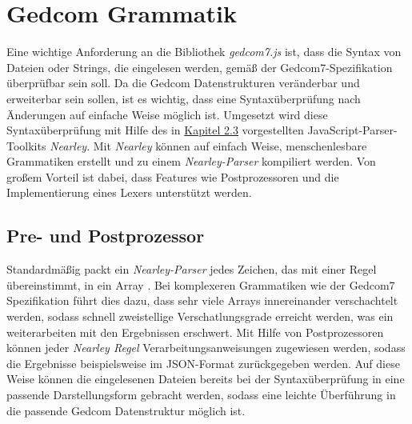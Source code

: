 \section{Gedcom Grammatik}
\label{sec: Konzept - Gedcom Grammatik}
Eine wichtige Anforderung an die Bibliothek \textit{gedcom7.js} ist, dass die Syntax von Dateien oder Strings, die eingelesen werden, gemäß der Gedcom7-Spezifikation überprüfbar sein soll. Da die Gedcom Datenstrukturen veränderbar und erweiterbar sein sollen, ist es wichtig, dass eine Syntaxüberprüfung nach Änderungen auf einfache Weise möglich ist. Umgesetzt wird diese Syntaxüberprüfung mit Hilfe des in \hyperref[sec: Nearley]{Kapitel 2.3} vorgestellten JavaScript-Parser-Toolkits \textit{Nearley}. Mit \textit{Nearley} können auf einfach Weise, menschenlesbare Grammatiken erstellt und zu einem \textit{Nearley-Parser} kompiliert werden. Von großem Vorteil ist dabei, dass Features wie Postprozessoren und die Implementierung eines Lexers unterstützt werden. 

\subsection{Pre- und Postprozessor}
\label{subsec: Konzept - Gedcom Grammatik - Pre- und Postprozessor}
Standardmäßig packt ein \textit{Nearley-Parser} jedes Zeichen, das mit einer Regel übereinstimmt, in ein Array \cite{NearleyDoc}. Bei komplexeren Grammatiken wie der Gedcom7 Spezifikation führt dies dazu, dass sehr viele Arrays innereinander verschachtelt werden, sodass schnell zweistellige Verschatlungsgrade erreicht werden, was ein weiterarbeiten mit den Ergebnissen erschwert. Mit Hilfe von Postprozessoren können jeder \textit{Nearley Regel} Verarbeitungsanweisungen zugewiesen werden, sodass die Ergebnisse beispielsweise im JSON-Format zurückgegeben werden. Auf diese Weise können die eingelesenen Dateien bereits bei der Syntaxüberprüfung in eine passende Darstellungsform gebracht werden, sodass eine leichte Überführung in die passende Gedcom Datenstruktur möglich ist.

